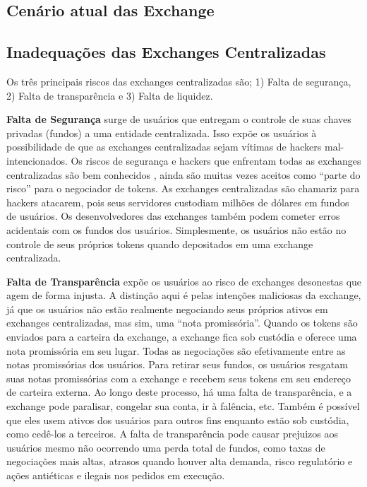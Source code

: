 \documentclass[UTF8,nofonts]{article}
\begin{document}
\begin{multicols}{2}
\section{Cenário atual das Exchange\label{sec:current_exchange_landscape}}

\subsection{Inadequações das Exchanges Centralizadas}
Os três principais riscos das exchanges centralizadas são; 1) Falta de segurança, 2) Falta de transparência e 3) Falta de liquidez.

\textbf{Falta de Segurança} surge de usuários que entregam o controle de suas chaves privadas (fundos) a uma entidade centralizada. Isso expõe os usuários à possibilidade de que as exchanges centralizadas sejam vítimas de hackers mal-intencionados. Os riscos de segurança e hackers que enfrentam todas as exchanges centralizadas são bem conhecidos \cite{coincheckhack}  \cite{mcmillan2014inside}, ainda são muitas vezes aceitos como \enquote{parte do risco} para o negociador de tokens. As exchanges centralizadas são chamariz para hackers atacarem, pois seus servidores custodiam milhões de dólares em fundos de usuários. Os desenvolvedores das exchanges também podem cometer erros acidentais com os fundos dos usuários. Simplesmente, os usuários não estão no controle de seus próprios tokens quando depositados em uma exchange centralizada.

\textbf{Falta de Transparência} expõe os usuários ao risco de exchanges desonestas que agem de forma injusta. A distinção aqui é pelas intenções maliciosas da exchange, já que os usuários não estão realmente negociando seus próprios ativos em exchanges centralizadas, mas sim, uma \enquote{nota promissória}. Quando os tokens são enviados para a carteira da exchange, a exchange fica sob custódia e oferece uma nota promissória em seu lugar. Todas as negociações são efetivamente entre as notas promissórias dos usuários. Para retirar seus fundos, os usuários resgatam suas notas promissórias com a exchange e recebem seus tokens em seu endereço de carteira externa. Ao longo deste processo, há uma falta de transparência, e a exchange pode paralisar, congelar sua conta, ir à falência, etc. Também é possível que eles usem ativos dos usuários para outros fins enquanto estão sob custódia, como cedê-los a terceiros. A falta de transparência pode causar prejuizos aos usuários mesmo não ocorrendo uma perda total de fundos, como taxas de negociações mais altas, atrasos quando houver alta demanda, risco regulatório e ações antiéticas e ilegais nos pedidos em execução.


\end{multicols}
\end{document}
